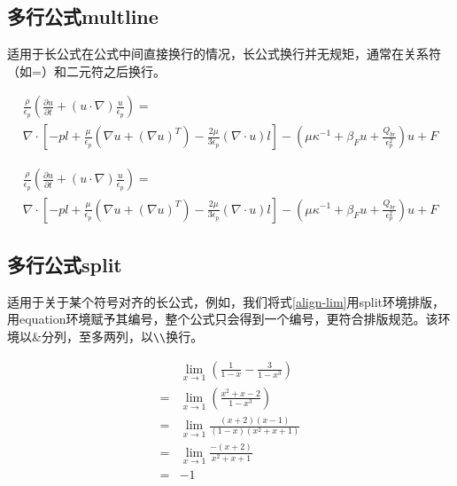 \subsection{多行公式multline}

适用于长公式在公式中间直接换行的情况，长公式换行并无规矩，通常在关系符（如=）和二元符之后换行。

\begin{latex}
\begin{multline}
\frac{\rho}{\epsilon_p} \left(\frac{\partial u}{\partial t}+(u \cdot \nabla)\frac{u}{\epsilon_p}\right)=\\
\nabla \cdot \left[ -pl+\frac{\mu}{\epsilon_p}\left( \nabla u+(\nabla u)^T\right)-\frac{2\mu}{3\epsilon_p}(\nabla \cdot u)l\right]-\left( \mu \kappa^{-1} + \beta_{F}u+ \frac{Q_{br}}{\epsilon^{2}_{p}} \right)u+F
\end{multline}
\end{latex}

\begin{multline}
\frac{\rho}{\epsilon_p} \left(\frac{\partial u}{\partial t}+(u \cdot \nabla)\frac{u}{\epsilon_p}\right)=\\
\nabla \cdot \left[ -pl+\frac{\mu}{\epsilon_p}\left( \nabla u+(\nabla u)^T\right)-\frac{2\mu}{3\epsilon_p}(\nabla \cdot u)l\right]-\left( \mu \kappa^{-1} + \beta_{F}u+ \frac{Q_{br}}{\epsilon^{2}_{p}} \right)u+F
\end{multline}

\subsection{多行公式split}

适用于关于某个符号对齐的长公式，例如，我们将式\eqref{align-lim}用split环境排版，用equation环境赋予其编号，整个公式只会得到一个编号，更符合排版规范。该环境以\&分列，至多两列，以\lstinline|\\|换行。


\begin{latex}
\begin{equation}
\begin{split}
&\lim\limits_{x\to 1}\left(\frac{1}{1-x}-\frac{3}{1-x^3}\right)\\
= &\lim\limits_{x\to 1}\left(\frac{x^2+x-2}{1-x^3}\right)  \\
= & \lim\limits_{x\to 1}\frac{(x+2)(x-1)}{(1-x)(x^2+x+1)}\\
= & \lim\limits_{x\to 1}\frac{-(x+2)}{x^2+x+1}\\
= & -1
\end{split}
\end{equation}
\end{latex}

